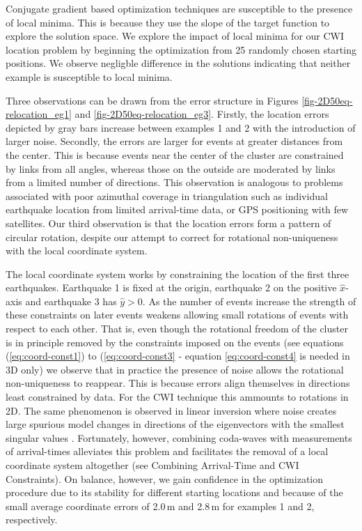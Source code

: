 \documentclass[12pt,double]{article}
\begin{document}
Conjugate gradient based optimization techniques are susceptible to
the presence of local minima. This is because they use the slope of
the target function to explore the solution space. We explore the
impact of local minima for our CWI location problem by beginning the
optimization from 25 randomly chosen starting positions. We observe
negligble difference in the solutions indicating that neither example 
is susceptible to local minima.

Three observations can be drawn from the error structure in Figures
\ref{fig-2D50eq-relocation_eg1} and \ref{fig-2D50eq-relocation_eg3}.
Firstly, the location errors depicted by gray bars increase between
examples 1 and 2 with the introduction of larger noise. Secondly,
the errors are larger for events at greater distances from the
center. This is because events near the center of the cluster are
constrained by links from all angles, whereas those on the outside
are moderated by links from a limited number of directions. This
observation is analogous to problems associated with poor azimuthal
coverage in triangulation such as individual earthquake
location from limited arrival-time data, or GPS positioning with few
satellites. Our third observation is that the location errors form a
pattern of circular rotation, despite our attempt to correct for
 rotational non-uniqueness with the local coordinate system.

The local coordinate system works by constraining the location of
the first three earthquakes. Earthquake 1 is fixed at the origin,
earthquake 2 on the positive $\hat{x}$-axis and earthquake 3 has
$\hat{y}>0$. As the number of events increase the strength of these
constraints on later events weakens allowing small rotations of
events with respect to each other. That is, even though the
rotational freedom of the cluster is in principle removed by the
constraints imposed on the events (see equations
(\ref{eq:coord-const1}) to (\ref{eq:coord-const3} - equation
\ref{eq:coord-const4} is needed in 3D only) we observe that in
practice the presence of noise allows the rotational non-uniqueness
to reappear. This is because errors align themselves in directions
least constrained by data. For the CWI technique this ammounts to rotations in 2D.
The same phenomenon is observed in linear inversion where noise
creates large spurious model changes in directions of the
eigenvectors with the smallest singular values \citep{dr_Aster05a}.
 Fortunately, however, combining coda-waves with
measurements of arrival-times alleviates this problem and facilitates
the removal of a local coordinate system altogether (see Combining Arrival-Time and 
CWI Constraints). On balance, however, we gain
confidence in the optimization procedure due to its stability for
different starting locations and because of the small average
coordinate errors of 2.0\,m and 2.8\,m for examples 1 and 2,
respectively.
\end{document}
